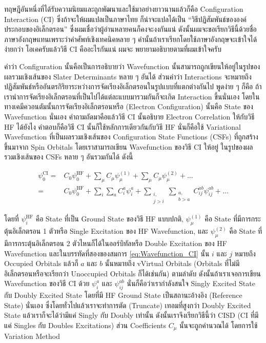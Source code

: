 ทฤษฎีอันหนึ่งที่ได้รับความนิยมและถูกพัฒนาและใช้มาอย่างยาวนานแล้วก็คือ Configuration Interaction (CI) ซึ่งถ้าจะให้ผมแปลเป็นภาษาไทย%
ก็น่าจะแปลได้เป็น \enquote{วิธีปฏิสัมพันธ์ขององค์ประกอบของอิเล็กตรอน} ซึ่งผมเชื่อว่าผู้อ่านหลายคนก็คงจะงงกันแน่ ดังนั้นผมจะขอเรียกวิธีนี้ด้วยชื่อ%
ภาษาอังกฤษแทนเพราะว่าคำศัพท์เชิงเทคนิคหลาย ๆ คำนั้นถ้าเราเรียกโดยใช้ภาษาอังกฤษจะเข้าใจได้ง่ายกว่า โอเคครับแล้ววิธี CI คืออะไรกันแน่ ผมจะ%
พยายามอธิบายตามที่ผมเข้าใจครับ

คำว่า Configuration นั้นคือเป็นการอธิบายว่า Wavefunction นั้นสามารถถูกเขียนให้อยู่ในรูปของผลรวมเชิงเส้นของ Slater Determinants
หลาย ๆ อันได้ ส่วนคำว่า Interactions จะหมายถึงปฏิสัมพันธ์หรืออันตรกิริยาระหว่างการจัดเรียงอิเล็กตรอนในรูปแบบที่แตกต่างกันไป พูดง่าย ๆ ก็คือ%
ถ้าเรานำการจัดเรียงอิเล็กตรอนที่เป็นไปได้แต่ละแบบมารวมกันก็จะเกิด Interaction ขึ้นนั่นเอง โดยในทางเคมีควอนตัมนั้นการจัดเรียงอิเล็กตรอนหรือ
(Electron Configuration) นั้นคือ State ของ Wavefunction นั่นเอง คำถามถัดมาคือแล้ววิธี CI นั้นอธิบาย Electron Correlation
ให้กับวิธี HF ได้ยังไง คำตอบก็คือวิธี CI นั้นก็ใช้หลักการเดียวกันกับวิธี HF นั่นก็คือใช้ Variational Wavefunction ที่เป็นผลรวมเชิงเส้นของ
Configuration State Functions (CSFs) ที่ถูกสร้างขึ้นมาจาก Spin Orbitals โดยเราสามารถเขียน Wavefunction ของวิธี CI ให้อยู่%
ในรูปของผลรวมเชิงเส้นของ CSFs หลาย ๆ อันรวมกันได้ ดังนี้

\begin{equation}
    \label{eq:Wavefunction_CI}
    \begin{aligned}
        \psi_0^{\mathrm{CI}}
        = & C_0 \psi_0^{\mathrm{HF}}
        + \sum_\mu C_\mu \psi_\mu^{(1)}
        + \sum_\mu C_\mu \psi_\mu^{(2) }
        + \ldots                     \\
        = & C_0 \psi_0^{\mathrm{HF}}
        +\sum_i \sum_a C_i^a \psi_i^a
        + \sum_{\substack{i,         \\ j>i}} \sum_{\substack{a, \\ b>a}} C_{i j}^{a b} \psi_{i j}^{a b}
        + \ldots
    \end{aligned}
\end{equation}

\noindent โดยที่ $\psi_i^{\mathrm{HF}}$ คือ State ที่เป็น Ground State ของวิธี HF แบบปกติ, $\psi_\mu^{(1)}$ คือ State
ที่มีการกระตุ้นอิเล็กตรอน 1 ตัวหรือ Single Excitation ของ HF Wavefunction, และ $\psi_\mu^{(2)}$ คือ State ที่มีการกระตุ้นอิเล็กตรอน
2 ตัวไหนก็ได้ในออร์บิทัลหรือ Double Excitation ของ HF Wavefunction และในบรรทัดที่สองของสมการ \eqref{eq:Wavefunction_CI} นั้น
$i$ และ $j$ หมายถึง Occupied Orbitals แล้วก็ $a$ และ $b$ นั้นหมายถึง vVirtual Orbitals (Orbitals ที่ไม่มีอิเล็กตรอนหรือจะเรียกว่า
Unoccupied Orbitals ก็ได้เช่นกัน) ตามลำดับ ดังนั้นถ้าเราเจอการเขียน Wavefunction ของวิธี CI ด้วย $\psi_i^a$ และ $\psi_{i j}^{a b}$
นั่นก็คือว่าเรากำลังสนใจ Singly Excited State กับ Doubly Excited State โดยที่มี HF Ground State เป็นสถานะอ้างอิง (Reference
State) นั่นเอง ซึ่งโดยทั่วไปแล้วเราจะทำการตัด (Truncate) เทอมที่สูงกว่า Doubly Excited State แล้วเราก็จะได้ว่ามีแค่ Singly กับ Doubly
เท่านั้น ดังนั้นเราจึงเรียกวิธีนี้ว่า CISD (CI ที่มีแค่ Singles กับ Doubles Excitations) ส่วน Coefficients $C_\mu$ นั้นจะถูกคำนวณได้%
โดยการใช้ Variation Method

